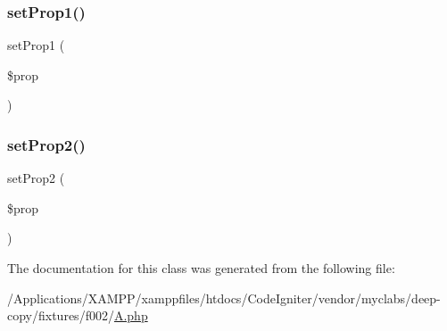 \mbox{\label{class_deep_copy_1_1f002_1_1_a_ac7c0737dc43da27257ca2d769734ca21}} 
\subsubsection{\texorpdfstring{set\+Prop1()}{setProp1()}}
{\footnotesize\ttfamily set\+Prop1 (\begin{DoxyParamCaption}\item[{}]{\$prop }\end{DoxyParamCaption})}

\mbox{\label{class_deep_copy_1_1f002_1_1_a_a9ed1216689ffd26b8079935ee8925be5}} 
\subsubsection{\texorpdfstring{set\+Prop2()}{setProp2()}}
{\footnotesize\ttfamily set\+Prop2 (\begin{DoxyParamCaption}\item[{}]{\$prop }\end{DoxyParamCaption})}



The documentation for this class was generated from the following file\+:\begin{DoxyCompactItemize}
\item 
/\+Applications/\+X\+A\+M\+P\+P/xamppfiles/htdocs/\+Code\+Igniter/vendor/myclabs/deep-\/copy/fixtures/f002/\mbox{\hyperlink{f002_2_a_8php}{A.\+php}}\end{DoxyCompactItemize}
